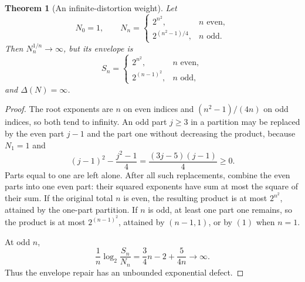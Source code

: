 \documentclass[11pt,a4paper]{article}
\numberwithin{equation}{section}
\newtheorem{theorem}{Theorem}[section]
\theoremstyle{definition}
\theoremstyle{remark}
\begin{document}
\begin{theorem}[An infinite-distortion weight]
\label{thm:deepdips}
Let
\begin{equation}
 N_0=1,\qquad
 N_n=
 \begin{cases}
 2^{n^2},&n\text{ even},\\
 2^{(n^2-1)/4},&n\text{ odd}.
 \end{cases}
 \label{eq:deepdips}
\end{equation}
Then $N_n^{1/n}\to\infty$, but its envelope is
\begin{equation}
 S_n=
 \begin{cases}
 2^{n^2},&n\text{ even},\\
 2^{(n-1)^2},&n\text{ odd},
 \end{cases}
 \label{eq:deepdipsenvelope}
\end{equation}
and $\Delta(N)=\infty$.
\end{theorem}
\begin{proof}
The root exponents are $n$ on even indices and $(n^2-1)/(4n)$ on odd
indices, so both tend to infinity. An odd part $j\ge3$ in a partition
may be replaced by the even part $j-1$ and the part one without decreasing
the product, because $N_1=1$ and
\[
 (j-1)^2-\frac{j^2-1}{4}=\frac{(3j-5)(j-1)}4\ge0.
\]
Parts equal to one are left alone. After all such replacements, combine
the even parts into one even part: their squared exponents have sum at
most the square of their sum. If the original total $n$ is even, the
resulting product is at most $2^{n^2}$, attained by the one-part
partition. If $n$ is odd, at least one part one remains, so the product
is at most $2^{(n-1)^2}$, attained by $(n-1,1)$, or by $(1)$ when
$n=1$.

At odd $n$,
\[
 \frac1n\log_2\frac{S_n}{N_n}
 =\frac34n-2+\frac{5}{4n}\longrightarrow\infty.
\]
Thus the envelope repair has an unbounded exponential defect.
\end{proof}
\end{document}
